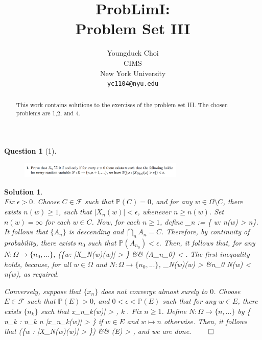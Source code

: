 \documentclass{article} %
\title{ProbLimI: \\
Problem Set III}
\author{
Youngduck Choi \\
CIMS \\
New York University\\
\texttt{yc1104@nyu.edu} \\
}
\def\eQb#1\eQe{\begin{eqnarray*}#1\end{eqnarray*}}
\theoremstyle{quest}
\newtheorem*{question}{Question}
\newtheorem*{solution}{Solution}
\begin{document}
\maketitle

\begin{abstract}
This work contains solutions to the exercises of the problem set III. The
chosen problems are 1,2, and 4.
\end{abstract}

\bigskip

\begin{question}[1]
\hfill
\begin{figure}[h!]
  \centering
    \includegraphics[width=0.7\textwidth]{prob-e3-p1.png}
\end{figure}
\end{question}
\begin{solution} \hfill \\
Fix $\epsilon > 0$.  
Choose $C \in \mathscr{F}$ such that $\mathbb{P}(C) = 0$,
and for any $w \in \Omega \setminus C$, 
there exists $n(w) \geq 1$, such that $|X_n(w)| < \epsilon$, whenever $n \geq n(w)$.
Set $n(w) = \infty$ for each $w \in C$.
Now, for each $n \geq 1$, define
\eQb
A_n := \{ w: n(w) > n\}. 
\eQe 
It follows that $\{ A_n \}$ is descending and $\bigcap_n A_n = C$. Therefore, by
continuity of probability, there exists $n_0$ such that $\mathbb{P}(A_{n_0}) < 
\epsilon$. Then, it follows that, for any $N:\Omega \to \{ n_0,...\}$, 
\eQb
\mathbb{P}(\{w: |X_{N(w)}(w)| > \epsilon\} &\leq& (A_{n_0}) < \epsilon. 
\eQe  
The first inequality holds, because, for all $w \in \Omega$ and $N:\Omega 
\to \{n_0,...\}$,
\eQb
X_{N(w)}(w) > \epsilon &\implies n_0 \leq N(w) < n(w), 
\eQe
as required. 

\bigskip

Conversely, suppose that $\{x_n\}$ does not converge almost surely to $0$. Choose
$E \in \mathscr{F}$ such that $\mathbb{P}(E) > 0$, and $0 < \epsilon < \mathbb{P}(E)$
such that for any $w \in E$, there exists $\{n_k\}$ such that
\eQb
|x_{n_k}(w)| > \epsilon , \>\>  \>\> k .
\eQe  
Fix $n \geq 1$. Define $N: \Omega \to \{n,...\}$ by 
\eQb
w \mapsto \inf\{ n_k \>: \> 
n_k \geq n \>\>  \>\> |x_{n_k}(w)| > \epsilon \} 
\eQe
if $w \in E$ and $w \mapsto n$ otherwise.
Then, it follows that
\eQb
\mathbb{P}(\{w : |X_{N(w)}(w)| > \epsilon\}) &\geq& (E) > \epsilon, 
\eQe
and we are done. \hfill $\qed$


\end{solution}
\end{document}
